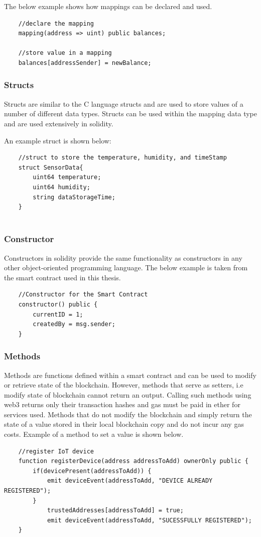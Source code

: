 \documentclass[11pt,openright]{report}
\begin{document}
The below example shows how mappings can be declared and used.
\begin{verbatim}
    //declare the mapping
    mapping(address => uint) public balances;
    
    //store value in a mapping
    balances[addressSender] = newBalance;
\end{verbatim}

\subsubsection{Structs}
Structs are similar to the C language structs and are used to store values of a number of different data types. Structs can be used within the mapping data type and are used extensively in solidity.

An example struct is shown below:
\begin{verbatim}
    //struct to store the temperature, humidity, and timeStamp
    struct SensorData{
        uint64 temperature;
        uint64 humidity;
        string dataStorageTime;
    }
    
\end{verbatim}

\subsubsection{Constructor}
Constructors in solidity provide the same functionality as constructors in any other object-oriented programming language. The below example is taken from the smart contract used in this thesis.
\begin{verbatim}
    //Constructor for the Smart Contract
    constructor() public {
        currentID = 1;
        createdBy = msg.sender;
    }
\end{verbatim}

\subsubsection{Methods}
Methods are functions defined within a smart contract and can be used to modify or retrieve state of the blockchain. However, methods that serve as setters, i.e modify state of blockchain cannot return an output. Calling such methods using web3 returns only their transaction hashes and gas must be paid in ether for services used. Methods that do not modify the blockchain and simply return the state of a value stored in their local blockchain copy and do not incur any gas costs. Example of a method to set a value is shown below.
\begin{verbatim}
    //register IoT device
    function registerDevice(address addressToAdd) ownerOnly public {
        if(devicePresent(addressToAdd)) {
            emit deviceEvent(addressToAdd, "DEVICE ALREADY REGISTERED");
        }
            trustedAddresses[addressToAdd] = true;
            emit deviceEvent(addressToAdd, "SUCESSFULLY REGISTERED");
    }
\end{verbatim}
\end{document}
